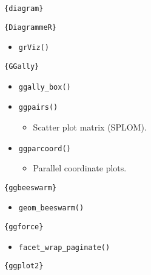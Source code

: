 \documentclass[
]{book}
\providecommand{\tightlist}{%
  \setlength{\itemsep}{0pt}\setlength{\parskip}{0pt}}
\begin{document}
\texttt{\{diagram\}}

\texttt{\{DiagrammeR\}}

\begin{itemize}
\tightlist
\item
  \texttt{grViz()}
\end{itemize}

\texttt{\{GGally\}}

\begin{itemize}
\tightlist
\item
  \texttt{ggally\_box()}
\item
  \texttt{ggpairs()}

  \begin{itemize}
  \tightlist
  \item
    Scatter plot matrix (SPLOM).
  \end{itemize}
\item
  \texttt{ggparcoord()}

  \begin{itemize}
  \tightlist
  \item
    Parallel coordinate plots.
  \end{itemize}
\end{itemize}

\texttt{\{ggbeeswarm\}}

\begin{itemize}
\tightlist
\item
  \texttt{geom\_beeswarm()}
\end{itemize}

\texttt{\{ggforce\}}

\begin{itemize}
\tightlist
\item
  \texttt{facet\_wrap\_paginate()}
\end{itemize}

\texttt{\{ggplot2\}}
\end{document}
